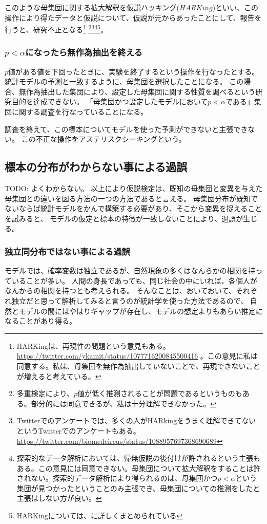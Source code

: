 このような母集団に関する拡大解釈を仮説ハッキング($HARKing$)といい、この操作により得たデータと仮説について、仮説が元からあったことにして、報告を行うと、研究不正となる\footnote{
    HARKingは、再現性の問題という意見もある。
    \url{https://twitter.com/ykamit/status/1077716200845500416} 。この意見に私は同意する。私は、母集団を無作為抽出していないことで、再現できないことが増えると考えている。
}
\footnote{
    多重検定により、$p$値が低く推測されることが問題であるというものもある\cite{池田_功毅2016,中村_大輝2021sp20016}。部分的には同意できるが、私は十分理解できなかった。
}\footnote{
    Twitterでのアンケートでは、多くの人がHARkingをうまく理解できてないというTwitterでのアンケートもある。
    \url{https://twitter.com/biomedcircus/status/1088957697368690689}
}\footnote{
    探索的なデータ解析においては、帰無仮説の後付けが許されるという主張もある。この意見には同意できない。母集団について拡大解釈をすることは許されない。探索的データ解析により得られるのは、母集団かつ$p<\alpha$という集団が見つかったということのみ主張でき、母集団についての推測をしたと主張はしない方が良い。
}\footnote{
    HARKingについては、\cite{kerr1998harking}に詳しくまとめられている
}。


\subsubsection{$p<\alpha$になったら無作為抽出を終える}
$p$値がある値を下回ったときに、実験を終了するという操作を行なったとする。
統計モデルの予測と一致するように、母集団を選択したことになる。
この場合、無作為抽出した集団により、設定した母集団に関する性質を調べるという研究目的を達成できない。
「母集団かつ設定したモデルにおいて$p<\alpha$である」集団に関する調査を行なっていることになる。

調査を終えて、この標本についてモデルを使った予測ができないと主張できない。
この不正な操作をアステリスクシーキングという。

\subsection{標本の分布がわからない事による過誤}
TODO: よくわからない。
以上により仮説検定は、既知の母集団と変異を与えた母集団との違いを図る方法の一つの方法であると言える。
母集団分布が既知でないならば統計モデルをかんで構築する必要があり、そこから変異を捉えることを試みると、
モデルの仮定と標本の特徴が一致しないことにより、過誤が生じる。

\subsubsection{独立同分布ではない事による過誤}
モデルでは、確率変数は独立であるが、自然現象の多くはなんらかの相関を持っていることが多い。
人間の身長であっても、同じ社会の中にいれば、各個人がなんからの相関を持つとも考えられる。
そんなことは、おいておいて、それぞれ独立だと思って解析してみると言うのが統計学を使った方法であるので、
自然とモデルの間にはやはりギャップが存在し、モデルの想定よりもあらい推定になることがあり得る。
\fi
{}
